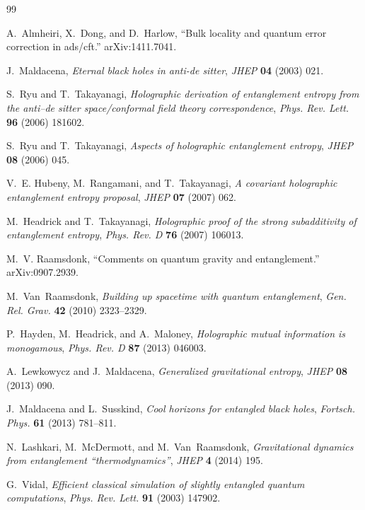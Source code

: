\documentclass[12pt]{article}
\theoremstyle{plain}
\theoremstyle{plain}
\theoremstyle{plain}
\theoremstyle{plain}
\theoremstyle{result}
\theoremstyle{remark}
\theoremstyle{conjecture}
\theoremstyle{observation}
\theoremstyle{definition}
\theoremstyle{corollary}
\theoremstyle{definition}
\theoremstyle{definition}
\theoremstyle{assumption}
\theoremstyle{definition}
\theoremstyle{problem}
\theoremstyle{fact}
\begin{document}
\providecommand{\href}[2]{#2}\begingroup\raggedright\begin{thebibliography}{99}

A.~Almheiri, X.~Dong, and D.~Harlow, ``Bulk locality and quantum error
  correction in ads/cft.'' arXiv:1411.7041.

J.~Maldacena, {\it Eternal black holes in anti-de sitter},  {\em JHEP} {\bf 04}
  (2003) 021.

S.~Ryu and T.~Takayanagi, {\it Holographic derivation of entanglement entropy
  from the anti--de sitter space/conformal field theory correspondence},  {\em
  Phys. Rev. Lett.} {\bf 96} (2006) 181602.

S.~Ryu and T.~Takayanagi, {\it Aspects of holographic entanglement entropy},
  {\em JHEP} {\bf 08} (2006) 045.

V.~E. Hubeny, M.~Rangamani, and T.~Takayanagi, {\it A covariant holographic
  entanglement entropy proposal},  {\em JHEP} {\bf 07} (2007) 062.

M.~Headrick and T.~Takayanagi, {\it Holographic proof of the strong
  subadditivity of entanglement entropy},  {\em Phys. Rev. D} {\bf 76} (2007)
  106013.

M.~V. Raamsdonk, ``Comments on quantum gravity and entanglement.''
  arXiv:0907.2939.

M.~Van~Raamsdonk, {\it Building up spacetime with quantum entanglement},  {\em
  Gen. Rel. Grav.} {\bf 42} (2010) 2323--2329.

P.~Hayden, M.~Headrick, and A.~Maloney, {\it Holographic mutual information is
  monogamous},  {\em Phys. Rev. D} {\bf 87} (2013) 046003.

A.~Lewkowycz and J.~Maldacena, {\it Generalized gravitational entropy},  {\em
  JHEP} {\bf 08} (2013) 090.

J.~Maldacena and L.~Susskind, {\it Cool horizons for entangled black holes},
  {\em Fortsch. Phys.} {\bf 61} (2013) 781--811.

N.~Lashkari, M.~McDermott, and M.~Van~Raamsdonk, {\it Gravitational dynamics
  from entanglement ``thermodynamics''},  {\em JHEP} {\bf 4} (2014) 195.

G.~Vidal, {\it Efficient classical simulation of slightly entangled quantum
  computations},  {\em Phys. Rev. Lett.} {\bf 91} (2003) 147902.


\end{thebibliography}
\end{document}
